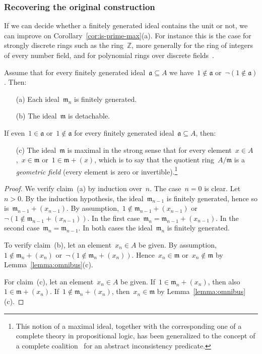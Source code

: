 \documentclass[envcountsect,envcountsame,runningheads]{llncs}
\newcommand{\aaa}{\mathfrak{a}}
\newcommand{\mmm}{\mathfrak{m}}
\newcommand{\ZZ}{\mathbb{Z}}
\renewcommand{\_}{\mathpunct{.}\,}
\begin{document}
\subsubsection{Recovering the original construction}

If we can decide whether a finitely generated ideal contains the
unit or not, we can improve on Corollary~\ref{cor:is-prime-max}(a). For instance this is the case for
strongly discrete rings such as the ring~$\ZZ$, more generally for the ring of
integers of every number field, and for polynomial rings over discrete
fields~\cite[Theorem~VIII.1.5]{mines-richman-ruitenburg:constructive-algebra}.

\begin{proposition}\label{prop:with-test}
Assume that for every finitely generated ideal~$\aaa \subseteq A$ we have~$1
\not\in \aaa$ or~$\neg(1 \not\in \aaa)$. Then:
\begin{enumerate}
\item[\textnormal{(a)}] Each ideal~$\mmm_n$ is finitely generated.
\item[\textnormal{(b)}] The ideal~$\mmm$ is detachable.
\end{enumerate}
If even~$1 \in \aaa$ or~$1 \not\in \aaa$ for every finitely generated ideal~$\aaa \subseteq
A$, then:
\begin{enumerate}
\addtocounter{enumi}{2}
\item[\textnormal{(c)}] The ideal~$\mmm$ is maximal in the strong sense that for every element~$x
\in A$,~$x \in \mmm$ or~$1 \in \mmm + (x)$, which is to say that the quotient ring~$A/\mmm$ is a
\emph{geometric field} (every element is zero or invertible).\footnote{This
notion of a maximal ideal, together with the corresponding one of a complete
theory in propositional logic, has been generalized to the concept of a
complete coalition~\cite{schuster-wessel:cie2020,schuster-wessel:jacincpred} for an abstract inconsistency
predicate.}
\end{enumerate}
\end{proposition}

\begin{proof}We verify claim~(a) by induction over~$n$. The case~$n = 0$ is
clear. Let~$n > 0$. By the induction hypothesis, the ideal~$\mmm_{n-1}$ is finitely
generated, hence so is~$\mmm_{n-1} + (x_{n-1})$. By assumption,~$1 \not\in \mmm_{n-1} +
(x_{n-1})$ or~$\neg(1 \not\in \mmm_{n-1} + (x_{n-1}))$. In the first
case~$\mmm_n = \mmm_{n-1} + (x_{n-1})$. In the second case~$\mmm_n =
\mmm_{n-1}$. In both cases
the ideal~$\mmm_n$ is finitely generated.

To verify claim~(b), let an element~$x_n \in A$ be given. By assumption,~$1
\not\in \mmm_n + (x_n)$ or~$\neg(1 \not\in \mmm_n + (x_n))$. Hence~$x_n \in
\mmm$ or~$x_n \not\in \mmm$ by Lemma~\ref{lemma:omnibus}(c).

For claim~(c), let an element~$x_n \in A$ be given. If~$1 \in \mmm_n + (x_n)$,
then also~$1 \in \mmm + (x_n)$. If~$1 \not\in \mmm_n + (x_n)$, then~$x_n \in
\mmm$ by Lemma~\ref{lemma:omnibus}(c).
\end{proof}
\end{document}
